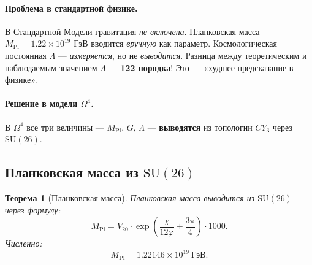 \documentclass[11pt,a4paper]{article}
\newcommand{\SU}{\mathrm{SU}}
\newcommand{\CY}{CY_3}
\newcommand{\Om}{\Omega^4}
\newcommand{\Mpl}{M_{\text{Pl}}}
\newtheorem{theorem}{Теорема}[section]
\theoremstyle{definition}
\begin{document}
\paragraph{Проблема в стандартной физике.}
В Стандартной Модели гравитация \emph{не включена}. Планковская 
масса $\Mpl = 1.22 \times 10^{19}$ ГэВ вводится \emph{вручную} 
как параметр. Космологическая постоянная $\Lambda$ — 
\emph{измеряется}, но не \emph{выводится}. Разница между 
теоретическим и наблюдаемым значением $\Lambda$ — 
\textbf{122 порядка}! Это — «худшее предсказание в физике».

\paragraph{Решение в модели $\Om$.}
В $\Om$ все три величины — $\Mpl$, $G$, $\Lambda$ — 
\textbf{выводятся} из топологии $\CY$ через $\SU(26)$.

\subsection{Планковская масса из $\SU(26)$}
\label{subsec:planck-mass}

\begin{theorem}[Планковская масса]
\label{thm:planck-mass}
Планковская масса выводится из $\SU(26)$ через формулу:
\begin{equation}
    \boxed{
    \Mpl = V_{20} \cdot \exp\left(\frac{\chi}{12\varphi} 
    + \frac{3\pi}{4}\right) \cdot 1000.
    }
    \label{eq:planck-mass}
\end{equation}
Численно:
\begin{equation}
    \Mpl = 1.22146 \times 10^{19}~\text{ГэВ}.
\end{equation}
\end{theorem}
\end{document}
